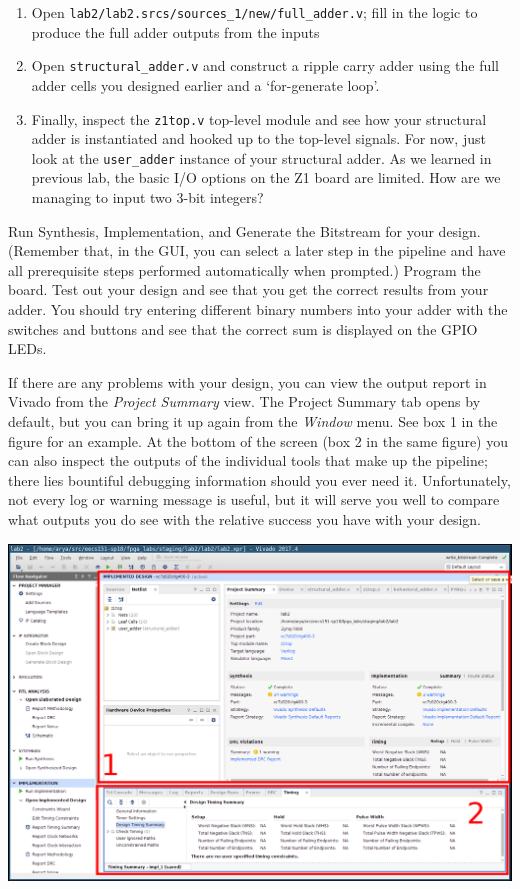 \documentclass[11pt]{article}
\begin{document}
\begin{enumerate}
  \item Open \verb|lab2/lab2.srcs/sources_1/new/full_adder.v|; fill in the logic to produce the full adder outputs from the inputs
  \item Open \verb|structural_adder.v| and construct a ripple carry adder using the full adder cells you designed earlier and a `for-generate loop'.
  \item Finally, inspect the \verb|z1top.v| top-level module and see how your structural adder is instantiated and hooked up to the top-level signals. For now, just look at the \verb|user_adder| instance of your structural adder.
 As we learned in previous lab, the basic I/O options on the Z1 board are limited. How are we managing to input two 3-bit integers?
\end{enumerate}

Run Synthesis, Implementation, and Generate the Bitstream for your design. (Remember that, in the GUI, you can select a later step in the pipeline and have all prerequisite steps performed automatically when prompted.) Program the board. Test out your design and see that you get the correct results from your adder. You should try entering different binary numbers into your adder with the switches and buttons and see that the correct sum is displayed on the GPIO LEDs.

If there are any problems with your design, you can view the output report in Vivado from the \emph{Project Summary} view. The Project Summary tab opens by default, but you can bring it up again from the \emph{Window} menu. See box 1 in the figure for an example. At the bottom of the screen (box 2 in the same figure) you can also inspect the outputs of the individual tools that make up the pipeline; there lies bountiful debugging information should you ever need it. Unfortunately, not every log or warning message is useful, but it will serve you well to compare what outputs you do see with the relative success you have with your design.

\begin{center}
  \includegraphics[width=\textwidth]{figs/vivado_project_summary.png}
\end{center}
\end{document}
